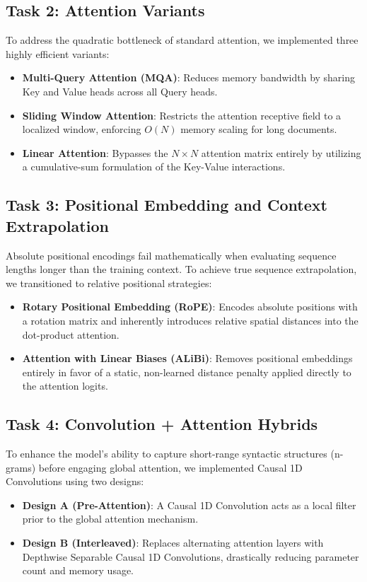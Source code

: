 \documentclass[11pt,a4paper]{article}
\begin{document}
\subsection{Task 2: Attention Variants}
To address the quadratic bottleneck of standard attention, we implemented three highly efficient variants:
\begin{itemize}
    \item \textbf{Multi-Query Attention (MQA)}: Reduces memory bandwidth by sharing Key and Value heads across all Query heads.
    \item \textbf{Sliding Window Attention}: Restricts the attention receptive field to a localized window, enforcing $O(N)$ memory scaling for long documents.
    \item \textbf{Linear Attention}: Bypasses the $N \times N$ attention matrix entirely by utilizing a cumulative-sum formulation of the Key-Value interactions.
\end{itemize}

\subsection{Task 3: Positional Embedding and Context Extrapolation}
Absolute positional encodings fail mathematically when evaluating sequence lengths longer than the training context. To achieve true sequence extrapolation, we transitioned to relative positional strategies:
\begin{itemize}
    \item \textbf{Rotary Positional Embedding (RoPE)}: Encodes absolute positions with a rotation matrix and inherently introduces relative spatial distances into the dot-product attention.
    \item \textbf{Attention with Linear Biases (ALiBi)}: Removes positional embeddings entirely in favor of a static, non-learned distance penalty applied directly to the attention logits.
\end{itemize}

\subsection{Task 4: Convolution + Attention Hybrids}
To enhance the model's ability to capture short-range syntactic structures (n-grams) before engaging global attention, we implemented Causal 1D Convolutions using two designs:
\begin{itemize}
    \item \textbf{Design A (Pre-Attention)}: A Causal 1D Convolution acts as a local filter prior to the global attention mechanism.
    \item \textbf{Design B (Interleaved)}: Replaces alternating attention layers with Depthwise Separable Causal 1D Convolutions, drastically reducing parameter count and memory usage.
\end{itemize}
\end{document}
